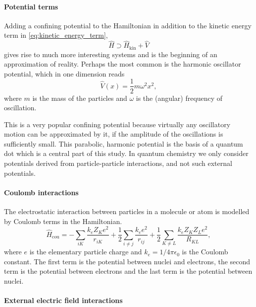     \paragraph{Potential terms}

    Adding a confining potential to the Hamiltonian in addition to the kinetic 
    energy term in \autoref{eq:kinetic_energy_term},
    \begin{equation}
        \hat{H} \supset \hat{H}_\text{kin} + \hat{V}
    \end{equation}
    gives rise to much more interesting systems and is the beginning of an approximation 
    of reality. Perhaps the most common is the harmonic oscillator potential, which 
    in one dimension reads 
    \begin{equation}
        \hat{V}(x) = \frac{1}{2}m\omega^2x^2,
    \end{equation}
    where $m$ is the mass of the particles and $\omega$ is the (angular) frequency 
    of oscillation.

    This is a very popular confining potential because virtually any oscillatory motion can 
    be approximated by it, if the amplitude of the oscillations is sufficiently small.
    This parabolic, harmonic
    potential is the basis of a quantum dot which is a central part of this study. 
    In quantum chemistry we only consider potentials derived from particle-particle
    interactions, and not such external potentials.

    \paragraph{Coulomb interactions}

    The electrostatic interaction between particles in a molecule or atom is 
    modelled by Coulomb terms in the Hamiltonian. 
    \begin{equation}
            \hat{H}_{\text{cou}} 
                = -\sum_{iK}\frac{k_eZ_Ke^2}{r_{iK}} 
                    + \frac{1}{2}\sum_{i \neq j} \frac{k_e e^2}{r_{ij}} 
                    + \frac{1}{2}\sum_{K \neq L} \frac{k_eZ_K Z_Le^2}{R_{KL}},
    \end{equation}
    where $e$ is the elementary particle charge and $k_e = 1 / 4\pi\epsilon_0$ is the 
    Coulomb constant.
    The first term is the potential between nuclei and electrons, the second term is
    the potential between electrons and the last term is the potential between 
    nuclei.

    \paragraph{External electric field interactions}
   
